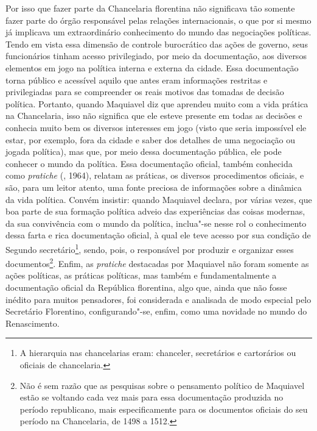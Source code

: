 Por isso que fazer parte da Chancelaria florentina não significava tão
somente fazer parte do órgão responsável pelas relações internacionais,
o que por si mesmo já implicava um extraordinário conhecimento do mundo
das negociações políticas. Tendo em vista essa dimensão de controle
burocrático das ações de governo, seus funcionários tinham acesso
privilegiado, por meio da documentação, aos diversos elementos em jogo
na política interna e externa da cidade. Essa documentação torna público
e acessível aquilo que antes eram informações restritas e privilegiadas
para se compreender os reais motivos das tomadas de decisão política.
Portanto, quando Maquiavel diz que aprendeu muito com a vida prática na
Chancelaria, isso não significa que ele esteve presente em todas as
decisões e conhecia muito bem os diversos interesses em jogo (visto que
seria impossível ele estar, por exemplo, fora da cidade e saber dos
detalhes de uma negociação ou jogada política), mas que, por meio dessa
documentação pública, ele pode conhecer o mundo da política. Essa
documentação oficial, também conhecida como \emph{pratiche} (,
1964), relatam as práticas, os diversos procedimentos oficiais, e são,
para um leitor atento, uma fonte preciosa de informações sobre a
dinâmica da vida política. Convém insistir: quando Maquiavel declara,
por várias vezes, que boa parte de sua formação política adveio das
experiências das coisas modernas, da sua convivência com o mundo da
política, inclua"-se nesse rol o conhecimento dessa farta e rica
documentação oficial, à qual ele teve acesso por sua condição de Segundo
secretário\footnote{A hierarquia nas chancelarias eram: chanceler,
  secretários e cartorários ou oficiais de chancelaria.}, sendo, pois, o
responsável por produzir e organizar esses documentos\footnote{Não é sem
  razão que as pesquisas sobre o pensamento político de Maquiavel estão
  se voltando cada vez mais para essa documentação produzida no período
  republicano, mais especificamente para os documentos oficiais do seu
  período na Chancelaria, de 1498 a 1512.}. Enfim, as \emph{pratiche}
destacadas por Maquiavel não foram somente as ações políticas, as
práticas políticas, mas também e fundamentalmente a documentação oficial
da República florentina, algo que, ainda que não fosse inédito para
muitos pensadores, foi considerada e analisada de modo especial pelo
Secretário Florentino, configurando"-se, enfim, como uma novidade no
mundo do Renascimento.

